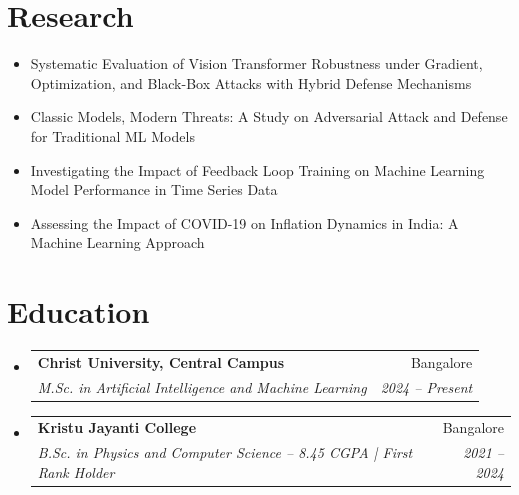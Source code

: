 \documentclass[letterpaper,11pt]{article}
\makeatletter
\newcommand{\resumeItem}[1]{\item\small{{#1 \vspace{-2pt}}}}
\newcommand{\resumeSubheading}[4]{
  \vspace{-2pt}\item
    \begin{tabular*}{0.97\textwidth}[t]{l@{\extracolsep{\fill}}r}
      \textbf{#1} & #2 \\
      \textit{\small#3} & \textit{\small #4} \\
    \end{tabular*}\vspace{-7pt}
}
\newcommand{\resumeSubHeadingListStart}{\begin{itemize}[leftmargin=0.15in, label={}]}
\newcommand{\resumeSubHeadingListEnd}{\end{itemize}}
\makeatother
\begin{document}
\section{Research}
\resumeSubHeadingListStart
  \resumeItem{Systematic Evaluation of Vision Transformer Robustness under Gradient, Optimization, and Black-Box Attacks with Hybrid Defense Mechanisms}
  \resumeItem{Classic Models, Modern Threats: A Study on Adversarial Attack and Defense for Traditional ML Models}
  \resumeItem{Investigating the Impact of Feedback Loop Training on Machine Learning Model Performance in Time Series Data}
  \resumeItem{Assessing the Impact of COVID-19 on Inflation Dynamics in India: A Machine Learning Approach}
\resumeSubHeadingListEnd

\section{Education}
\resumeSubHeadingListStart
  \resumeSubheading
    {Christ University, Central Campus}{Bangalore}
    {M.Sc. in Artificial Intelligence and Machine Learning}{2024 – Present}
  \resumeSubheading
    {Kristu Jayanti College}{Bangalore}
    {B.Sc. in Physics and Computer Science – 8.45 CGPA | First Rank Holder}{2021 – 2024}
\resumeSubHeadingListEnd
\end{document}
